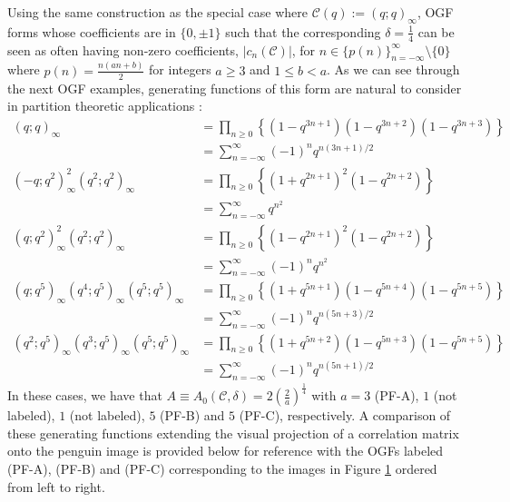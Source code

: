 \documentclass[12pt,reqno,a4letter]{article}
\numberwithin{figure}{section}
\numberwithin{table}{section}
\numberwithin{equation}{section}
\let\citep\cite
\theoremstyle{plain}
\numberwithin{theorem}{section}
\theoremstyle{definition}
\begin{document}
Using the same construction 
as the special case where $\mathcal{C}(q) := (q; q)_{\infty}$, OGF forms whose 
coefficients are in $\{0, \pm 1\}$ such that the corresponding $\delta = \frac{1}{4}$ 
can be seen as often having non-zero coefficients, $|c_n(\mathcal{C})|$, for 
$n \in \{p(n)\}_{n=-\infty}^{\infty} \setminus \{0\}$ where 
$\hat{p}(n) = \frac{n(an+b)}{2}$ for integers $a \geq 3$ and $1 \leq b < a$. 
As we can see through the next OGF examples, generating functions of this form 
are natural to consider in partition theoretic applications \citep[\S 19.9]{HARDYWRIGHT}: 
\begin{align*}
\tag{PF-A}
(q; q)_{\infty} & = \prod_{n \geq 0} \left\{(1-q^{3n+1})(1-q^{3n+2})(1-q^{3n+3})\right\} \\ 
     & = 
     \sum_{n=-\infty}^{\infty} (-1)^n q^{n(3n+1)/2} \\ 
(-q; q^2)_{\infty}^2 (q^2; q^2)_{\infty} & = \prod_{n \geq 0} \left\{(1+q^{2n+1})^2(1-q^{2n+2})\right\} \\ 
     & = 
     \sum_{n=-\infty}^{\infty} q^{n^2} \\ 
     (q; q^2)_{\infty}^2 (q^2; q^2)_{\infty} & = \prod_{n \geq 0} \left\{(1-q^{2n+1})^2(1-q^{2n+2})\right\} \\ 
     & = 
     \sum_{n=-\infty}^{\infty} (-1)^n q^{n^2} \\ 
\tag{PF-B}
(q; q^5)_{\infty} (q^4; q^5)_{\infty} (q^5; q^5)_{\infty} & = 
     \prod_{n \geq 0} \left\{(1+q^{5n+1})(1-q^{5n+4})(1-q^{5n+5})\right\} \\ 
     & = 
     \sum_{n=-\infty}^{\infty} (-1)^n q^{n(5n+3)/2} \\ 
\tag{PF-C}
(q^2; q^5)_{\infty} (q^3; q^5)_{\infty} (q^5; q^5)_{\infty} & = 
     \prod_{n \geq 0} \left\{(1+q^{5n+2})(1-q^{5n+3})(1-q^{5n+5})\right\} \\ 
     & = 
     \sum_{n=-\infty}^{\infty} (-1)^n q^{n(5n+1)/2}
\end{align*}
In these cases, we have that 
$A \equiv A_0(\mathcal{C}, \delta) = 2\left(\frac{2}{a}\right)^{\frac{1}{4}}$ with 
$a = 3$ (PF-A), $1$ (not labeled), $1$ (not labeled), $5$ (PF-B) and $5$ (PF-C), respectively. 
A comparison of these generating functions extending the visual projection of a correlation 
matrix onto the penguin image is provided below for reference 
with the OGFs labeled (PF-A), (PF-B) and (PF-C)
corresponding to the images in 
Figure \ref{figure_TucCompsOfPredictablePartFuncGFProductExps_v2} 
ordered from left to right. 

\begin{figure}[h!]

\begin{center}
\end{center}

\caption[Visualization of OGF correlation for LGFs using partition function OGFs]{}
\label{figure_TucCompsOfPredictablePartFuncGFProductExps_v2}

\end{figure}
\end{document}
